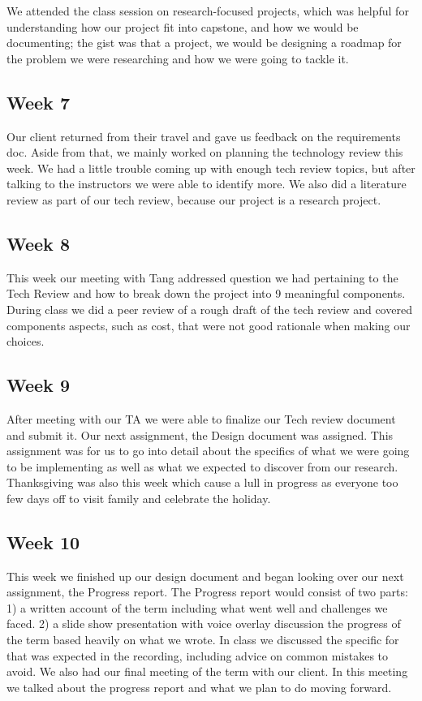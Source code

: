 We attended the class session on research-focused projects, which was helpful for understanding how our project fit into capstone, and how we would be documenting; the gist was that a project, we would be designing a roadmap for the problem we were researching and how we were going to tackle it.

\subsection{Week 7} 

Our client returned from their travel and gave us feedback on the requirements doc. Aside from that, we mainly worked on planning the technology review this week. We had a little trouble coming up with enough tech review topics, but after talking to the instructors we were able to identify more. We also did a literature review as part of our tech review, because our project is a research project.


\subsection{Week 8}
This week our meeting with Tang addressed question we had pertaining to the Tech Review and how to break down the project into 9 meaningful components. During class we did a peer review of a rough draft of the tech review and covered components aspects, such as cost, that were not good rationale when making our choices. 

\subsection{Week 9}
After meeting with our TA we were able to finalize our Tech review document and submit it. Our next assignment, the Design document was assigned. This assignment was for us to go into detail about the specifics of what we were going to be implementing as well as what we expected to discover from our research. Thanksgiving was also this week which cause a lull in progress as everyone too few days off to visit family and celebrate the holiday. 



\subsection{Week 10}
This week we finished up our design document and began looking over our next assignment, the Progress report. The Progress report would consist of two parts: 1) a written account of the term including what went well and challenges we faced. 2) a slide show presentation with voice overlay discussion the progress of the term based heavily on what we wrote. In class we discussed the specific for that was expected in the recording, including advice on common mistakes to avoid. We also had our final meeting of the term with our client. In this meeting we talked about the progress report and what we plan to do moving forward. 


